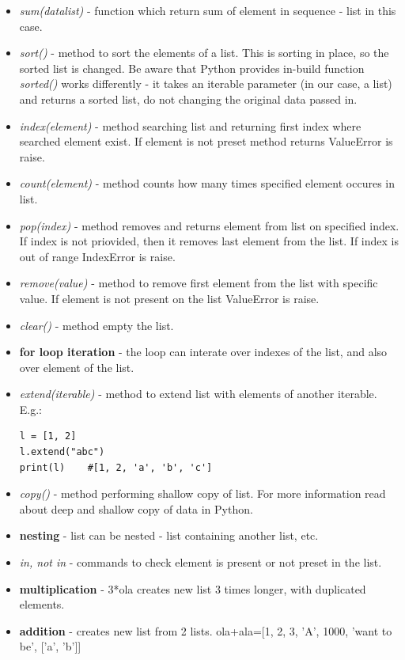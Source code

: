 \documentclass{article}
\begin{document}
\begin{itemize}
	\item \textit{sum(datalist)} - function which return sum of element in sequence - list in this case.
	\item \textit{sort()} - method to sort the elements of a list. This is sorting in place, so the sorted list is changed. Be aware that Python provides in-build function \textit{sorted()} works differently - it takes an iterable parameter (in our case, a list) and returns a sorted list, do not changing the original data passed in.
	\item \textit{index(element)} - method searching list and returning first index where searched element exist. If element is not preset method returns \textcolor{pythonerror}{ValueError} is raise.
	\item \textit{count(element)} - method counts how many times specified element occures in list.
	\item \textit{pop(index)} - method removes and returns element from list on specified index. If index is not priovided, then it removes last element from the list. If index is out of range \textcolor{pythonerror}{IndexError} is raise.
	\item \textit{remove(value)} - method to remove first element from the list with specific value. If element is not present on the list \textcolor{pythonerror}{ValueError} is raise.
	\item \textit{clear()} - method empty the list.
	\item \textbf{for loop iteration} - the loop can interate over indexes of the list, and also over element of the list.
	\item \textit{extend(iterable)} - method to extend list with elements of another iterable. E.g.:
	\begin{lstlisting}[style=pystyle]
l = [1, 2]
l.extend("abc")
print(l)	#[1, 2, 'a', 'b', 'c']
	\end{lstlisting}
	\item \textit{copy()} - method performing shallow copy of list. For more information read about deep and shallow copy of data in Python.
	\item \textbf{nesting} - list can be nested - list containing another list, etc.
	\item \textit{in, not in} - commands to check element is present or not preset in the list.
	\item \textbf{multiplication} - 3*ola creates new list 3 times longer, with duplicated elements.
	\item \textbf{addition} - creates new list from 2 lists. ola+ala=[1, 2, 3, 'A', 1000, 'want to be', ['a', 'b']]
	\end{itemize}
\end{document}

